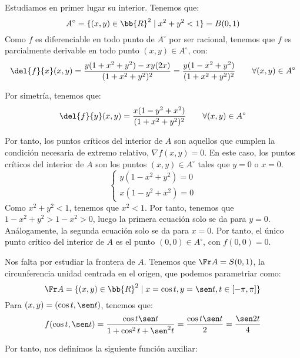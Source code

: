 \begin{ejercicio}
    Estudiamos en primer lugar su interior. Tenemos que: $$A^\circ = \{(x,y)\in \bb{R}^2\mid x^2+y^2< 1\}=B(0,1)$$
    Como $f$ es diferenciable en todo punto de $A^\circ$ por ser racional, tenemos que $f$ es parcialmente derivable en todo punto $(x,y)\in A^\circ$, con:
    \begin{equation*}
        \del{f}{x}(x,y) = \frac{y(1+x^2+y^2) - xy(2x)}{(1+x^2+y^2)^2} = \frac{y(1-x^2+y^2)}{(1+x^2+y^2)^2} \qquad \forall (x,y)\in A^\circ
    \end{equation*}

    Por simetría, tenemos que:
    \begin{equation*}
        \del{f}{y}(x,y) = \frac{x(1-y^2+x^2)}{(1+x^2+y^2)^2} \qquad \forall (x,y)\in A^\circ
    \end{equation*}

    Por tanto, los puntos críticos del interior de $A$ son aquellos que cumplen la condición necesaria de extremo relativo,
    $\nabla f(x,y)=0$. En este caso, los puntos críticos del interior de $A$ son los puntos $(x,y)\in A^\circ$ tales que $y=0$ o $x=0$.
    \begin{equation*}
        \left\{
            \begin{array}{l}
                y(1-x^2+y^2) = 0 \\
                x(1-y^2+x^2) = 0
            \end{array}
        \right.
    \end{equation*}
    Como $x^2+y^2<1$, tenemos que $x^2<1$. Por tanto, tenemos que $1-x^2+y^2 > 1-x^2> 0$,
    luego la primera ecuación solo se da para $y=0$. Análogamente, la segunda ecuación solo se da para $x=0$.
    Por tanto, el único punto crítico del interior de $A$ es el punto $(0,0)\in A^\circ$, con $f(0,0)=0$.

    Nos falta por estudiar la frontera de $A$. Tenemos que $\Fr A = S(0,1)$, la circunferencia unidad centrada en el origen, que
    podemos parametriar como:
    \begin{equation*}
        \Fr A = \{(x,y)\in \bb{R}^2\mid x=\cos t, y=\sen t, t\in [-\pi,\pi]\}
    \end{equation*}
    Para $(x,y)=(\cos t, \sen t)$, tenemos que:
    \begin{equation*}
        f(\cos t, \sen t) = \frac{\cos t \sen t}{1+\cos^2 t + \sen^2 t} = \frac{\cos t \sen t}{2} = \frac{\sen 2t}{4}
    \end{equation*}

    Por tanto, nos definimos la siguiente función auxiliar:


\end{ejercicio}
